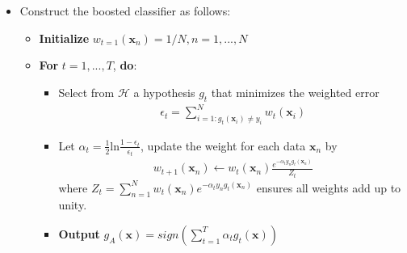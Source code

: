 \documentclass[norsk,a4paper,11pt]{article}
\begin{document}
\begin{itemize}
\begin{itemize}
		\item Construct the boosted classifier as follows:
		\begin{itemize}
			\item \textbf{Initialize} $w_{t=1} (\bm{x}_n) = 1/N, n=1,...,N$
			\item \textbf{For} $t=1,..., T$, \textbf{do}:
			\begin{itemize}
				\item Select from $\mathcal{H}$ a hypothesis $g_t$ that minimizes the weighted error 
				\begin{align}
					\epsilon_t = \sum_{i=1 : g_t(\bm{x}_i) \neq y_i}^N w_t (\bm{x}_i)
				\end{align}
				\item Let $\alpha_t = \frac{1}{2} \text{ln} \frac{1-\epsilon_t}{\epsilon_t}$, update the weight for each data $\bm{x}_n$ by
				\begin{align}
					w_{t+1} (\bm{x}_n) \leftarrow w_t(\bm{x}_n) \frac{e^{-\alpha_t y_n g_t (\bm{x}_n)}}{Z_t}
				\end{align} 
				where $Z_t = \sum_{n=1}^N w_t (\bm{x}_n) e^{-\alpha_t y_n g_t (\bm{x}_n)}$ ensures all weights add up to unity.
				\item \textbf{Output} $g_A (\bm{x}) = sign(\sum_{t=1}^T \alpha_t g_t (\bm{x}))$
			\end{itemize}
		\end{itemize}
	\end{itemize}
\end{itemize}
\end{document}
